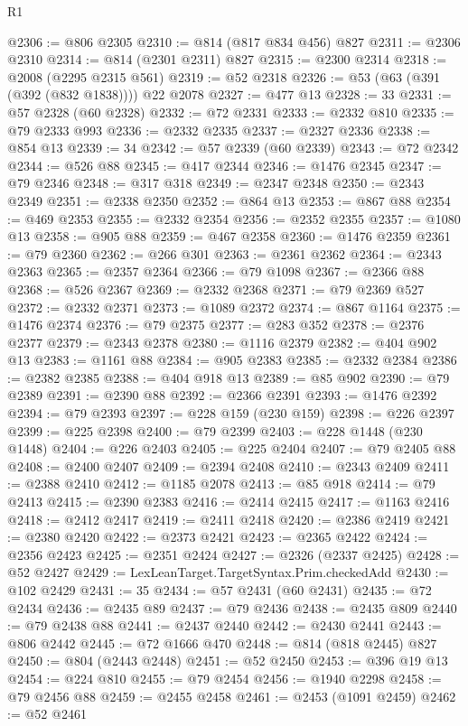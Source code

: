 \begin{lexlean}{R1}
\begin{coremodule}
@2306 := @806 @2305
@2310 := @814 (@817 @834 @456) @827
@2311 := @2306 @2310
@2314 := @814 (@2301 @2311) @827
@2315 := @2300 @2314
@2318 := @2008 (@2295 @2315 @561)
@2319 := @52 @2318
@2326 := @53 (@63 (@391 (@392 (@832 @1838)))) @22 @2078
@2327 := @477 @13
@2328 := 33
@2331 := @57 @2328 (@60 @2328)
@2332 := @72 @2331
@2333 := @2332 @810
@2335 := @79 @2333 @993
@2336 := @2332 @2335
@2337 := @2327 @2336
@2338 := @854 @13
@2339 := 34
@2342 := @57 @2339 (@60 @2339)
@2343 := @72 @2342
@2344 := @526 @88
@2345 := @417 @2344
@2346 := @1476 @2345
@2347 := @79 @2346
@2348 := @317 @318
@2349 := @2347 @2348
@2350 := @2343 @2349
@2351 := @2338 @2350
@2352 := @864 @13
@2353 := @867 @88
@2354 := @469 @2353
@2355 := @2332 @2354
@2356 := @2352 @2355
@2357 := @1080 @13
@2358 := @905 @88
@2359 := @467 @2358
@2360 := @1476 @2359
@2361 := @79 @2360
@2362 := @266 @301
@2363 := @2361 @2362
@2364 := @2343 @2363
@2365 := @2357 @2364
@2366 := @79 @1098
@2367 := @2366 @88
@2368 := @526 @2367
@2369 := @2332 @2368
@2371 := @79 @2369 @527
@2372 := @2332 @2371
@2373 := @1089 @2372
@2374 := @867 @1164
@2375 := @1476 @2374
@2376 := @79 @2375
@2377 := @283 @352
@2378 := @2376 @2377
@2379 := @2343 @2378
@2380 := @1116 @2379
@2382 := @404 @902 @13
@2383 := @1161 @88
@2384 := @905 @2383
@2385 := @2332 @2384
@2386 := @2382 @2385
@2388 := @404 @918 @13
@2389 := @85 @902
@2390 := @79 @2389
@2391 := @2390 @88
@2392 := @2366 @2391
@2393 := @1476 @2392
@2394 := @79 @2393
@2397 := @228 @159 (@230 @159)
@2398 := @226 @2397
@2399 := @225 @2398
@2400 := @79 @2399
@2403 := @228 @1448 (@230 @1448)
@2404 := @226 @2403
@2405 := @225 @2404
@2407 := @79 @2405 @88
@2408 := @2400 @2407
@2409 := @2394 @2408
@2410 := @2343 @2409
@2411 := @2388 @2410
@2412 := @1185 @2078
@2413 := @85 @918
@2414 := @79 @2413
@2415 := @2390 @2383
@2416 := @2414 @2415
@2417 := @1163 @2416
@2418 := @2412 @2417
@2419 := @2411 @2418
@2420 := @2386 @2419
@2421 := @2380 @2420
@2422 := @2373 @2421
@2423 := @2365 @2422
@2424 := @2356 @2423
@2425 := @2351 @2424
@2427 := @2326 (@2337 @2425)
@2428 := @52 @2427
@2429 := LexLeanTarget.TargetSyntax.Prim.checkedAdd
@2430 := @102 @2429
@2431 := 35
@2434 := @57 @2431 (@60 @2431)
@2435 := @72 @2434
@2436 := @2435 @89
@2437 := @79 @2436
@2438 := @2435 @809
@2440 := @79 @2438 @88
@2441 := @2437 @2440
@2442 := @2430 @2441
@2443 := @806 @2442
@2445 := @72 @1666 @470
@2448 := @814 (@818 @2445) @827
@2450 := @804 (@2443 @2448)
@2451 := @52 @2450
@2453 := @396 @19 @13
@2454 := @224 @810
@2455 := @79 @2454
@2456 := @1940 @2298
@2458 := @79 @2456 @88
@2459 := @2455 @2458
@2461 := @2453 (@1091 @2459)
@2462 := @52 @2461

\end{coremodule}
\end{lexlean}
